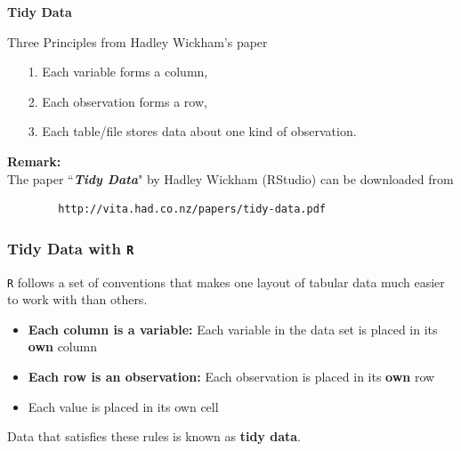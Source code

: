\documentclass[TIDYMASTER.tex]{subfiles}
\begin{document}
	\begin{frame}[fragile]
		\textbf{Tidy Data}
		\begin{framed}
			\noindent Three Principles from Hadley Wickham's paper
			\begin{itemize}
				\item[1.] Each variable forms a column, 
				\item[2.] Each observation forms a row, 
				\item[3.] Each table/file stores data about one kind of observation.
			\end{itemize}
		\end{framed}
		\noindent \textbf{Remark:} \\  The paper ``\textit{\textbf{Tidy Data}}" by Hadley Wickham (RStudio) can be downloaded from 
		\begin{verbatim}
		http://vita.had.co.nz/papers/tidy-data.pdf
		\end{verbatim}
	\end{frame}
\begin{frame}[fragile]
	\frametitle{Tidy Data with \texttt{R}}
	\Large

	
	\texttt{R} follows a set of conventions that makes one layout of tabular data much easier to work with than others.
	
	\begin{itemize}
				\item \textbf{Each column is a variable:} Each variable in the data set is placed in its \textbf{own} column
					\item \textbf{Each row is an observation:}
		Each observation is placed in its \textbf{own} row
		\item Each value is placed in its own cell

		
	\end{itemize}
	Data that satisfies these rules is known as \textbf{tidy data}.
\end{frame}
\end{document}
